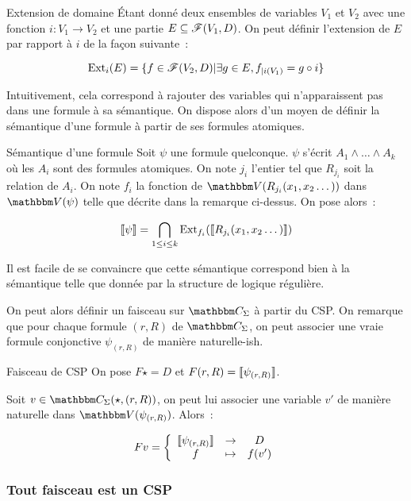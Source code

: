 \begin{defi}{Extension de domaine}
    Étant donné deux ensembles de variables $V_1$ et $V_2$ avec une fonction
    $i : V_1 \rightarrow V_2$ et une partie $E\subseteq\mathscr{F}(V_1, D)$. On peut définir
    l'extension de $E$ par rapport à $i$ de la façon suivante~:

    \[ \text{Ext}_i(E) = \{f\in\mathscr{F}(V_2,D) | \exists g\in E, f_{|i(V_1)} = g\circ i \} \]
\end{defi}

Intuitivement, cela correspond à rajouter des variables qui n'apparaissent pas dans une
formule à sa sémantique. On dispose alors d'un moyen de définir la sémantique d'une
formule à partir de ses formules atomiques.

\begin{defi}{Sémantique d'une formule}
    Soit $\psi$ une formule quelconque. $\psi$ s'écrit $A_1\wedge \dots \wedge A_k$ où
    les $A_i$ sont des formules atomiques. On note $j_i$ l'entier tel que $R_{j_i}$ soit
    la relation de $A_i$. On note $f_i$ la fonction de $\V(R_{j_i}(x_1, x_2 \dots))$
    dans $\V(\psi)$ telle que décrite dans la remarque ci-dessus. On pose alors~:

    \[ \llbracket {\psi} \rrbracket = \bigcap_{1\leq i\leq k} \text{Ext}_{f_i}(\llbracket {R_{j_i}(x_1, x_2\dots)} \rrbracket) \]

    Il est facile de se convaincre que cette sémantique correspond bien à la sémantique
    telle que donnée par la structure de logique régulière.
\end{defi}

On peut alors définir un faisceau sur $\C_\Sigma$ à partir du CSP. On remarque que pour 
chaque formule $(r,R)$ de $\C_\Sigma$, on peut associer une vraie formule conjonctive
$\psi_{(r,R)}$ de manière naturelle-ish. %

\begin{defi}{Faisceau de CSP}
    On pose $F\star = D$ et $F(r,R) = \llbracket {\psi_{(r,R)}} \rrbracket$.

    Soit $v\in\C_\Sigma(\star, (r,R))$, on peut lui associer une variable $v'$ de manière
    naturelle dans $\V(\psi_{(r,R)})$. Alors~:
    
    \[ Fv = \left\{\begin{array}{ccc}
                       \llbracket {\psi_{(r,R)}} \rrbracket & \rightarrow & D     \\
                              f           & \mapsto     & f(v') \\
    \end{array}\right.\]
\end{defi}

\subsubsection{Tout faisceau est un CSP}


